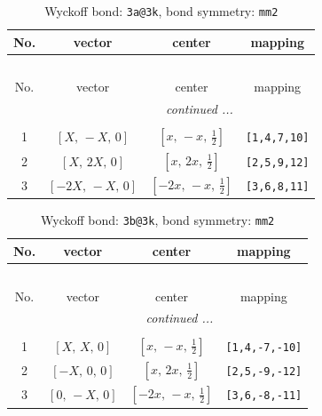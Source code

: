 \documentclass[fleqn,8pt]{jsarticle}
\begin{document}
\begin{longtable}{cccc}
\caption{Wyckoff bond: {\tt 3a@3k}, bond symmetry: {\tt mm2}}
 \\
 \hline \hline
No. & vector & center & mapping \\ \hline \endfirsthead

\multicolumn{3}{l}{\tablename\ \thetable{}} \\
 \hline \hline
No. & vector & center & mapping \\ \hline \endhead

 \hline \hline
\multicolumn{3}{r}{\footnotesize\it continued ...} \\ \endfoot

 \hline \hline
\multicolumn{3}{r}{} \\ \endlastfoot

1 & $\left[ X,\, - X,\, 0 \right]$ & $\left[ x,\, - x,\, \frac{1}{2} \right]$ & {\tt [1,4,7,10]} \\ \hline
2 & $\left[ X,\, 2 X,\, 0 \right]$ & $\left[ x,\, 2 x,\, \frac{1}{2} \right]$ & {\tt [2,5,9,12]} \\ \hline
3 & $\left[ - 2 X,\, - X,\, 0 \right]$ & $\left[ - 2 x,\, - x,\, \frac{1}{2} \right]$ & {\tt [3,6,8,11]} \\
\end{longtable}
\renewcommand{\arraystretch}{1.2}
\begin{longtable}{cccc}
\caption{Wyckoff bond: {\tt 3b@3k}, bond symmetry: {\tt mm2}}
 \\
 \hline \hline
No. & vector & center & mapping \\ \hline \endfirsthead

\multicolumn{3}{l}{\tablename\ \thetable{}} \\
 \hline \hline
No. & vector & center & mapping \\ \hline \endhead

 \hline \hline
\multicolumn{3}{r}{\footnotesize\it continued ...} \\ \endfoot

 \hline \hline
\multicolumn{3}{r}{} \\ \endlastfoot

1 & $\left[ X,\, X,\, 0 \right]$ & $\left[ x,\, - x,\, \frac{1}{2} \right]$ & {\tt [1,4,-7,-10]} \\ \hline
2 & $\left[ - X,\, 0,\, 0 \right]$ & $\left[ x,\, 2 x,\, \frac{1}{2} \right]$ & {\tt [2,5,-9,-12]} \\ \hline
3 & $\left[ 0,\, - X,\, 0 \right]$ & $\left[ - 2 x,\, - x,\, \frac{1}{2} \right]$ & {\tt [3,6,-8,-11]} \\
\end{longtable}
\end{document}
